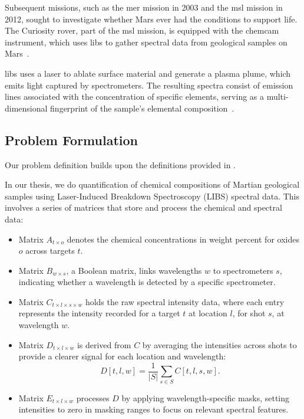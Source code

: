 Subsequent missions, such as the \gls{mer} mission in 2003 and the \gls{msl} mission in 2012, sought to investigate whether Mars ever had the conditions to support life. 
The Curiosity rover, part of the \gls{msl} mission, is equipped with the \gls{chemcam} instrument, which uses \gls{libs} to gather spectral data from geological samples on Mars~\cite{wiensChemcam2012}.

\gls{libs} uses a laser to ablate surface material and generate a plasma plume, which emits light captured by spectrometers. 
The resulting spectra consist of emission lines associated with the concentration of specific elements, serving as a multi-dimensional fingerprint of the sample's elemental composition~\cite{cleggRecalibrationMarsScience2017}.

\subsection{Problem Formulation}

Our problem definition builds upon the definitions provided in \citet{p9_paper}.

In our thesis, we do quantification of chemical compositions of Martian geological samples using Laser-Induced Breakdown Spectroscopy (LIBS) spectral data.
This involves a series of matrices that store and process the chemical and spectral data:

\begin{itemize}
    \item Matrix \(A_{t \times o}\) denotes the chemical concentrations in weight percent for oxides \(o\) across targets \(t\).
    \item Matrix \(B_{w \times s}\), a Boolean matrix, links wavelengths \(w\) to spectrometers \(s\), indicating whether a wavelength is detected by a specific spectrometer.
    \item Matrix \(C_{t \times l \times s \times w}\) holds the raw spectral intensity data, where each entry represents the intensity recorded for a target \(t\) at location \(l\), for shot \(s\), at wavelength \(w\).
    \item Matrix \(D_{t \times l \times w}\) is derived from \(C\) by averaging the intensities across shots to provide a clearer signal for each location and wavelength:
    \[
    D[t, l, w] = \frac{1}{|S|} \sum_{s \in S} C[t, l, s, w].
    \]
    \item Matrix \(E_{t \times l \times w}\) processes \(D\) by applying wavelength-specific masks, setting intensities to zero in masking ranges to focus on relevant spectral features.
\end{itemize}

